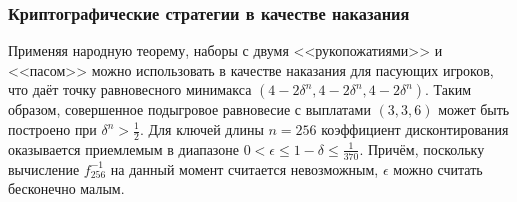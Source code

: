 \begin{frame}
	\frametitle{Криптографические стратегии в качестве наказания}
	Применяя народную теорему, наборы с двумя <<рукопожатиями>> и <<пасом>> можно использовать в качестве наказания для пасующих игроков, что даёт точку равновесного минимакса $(4 - 2 \delta^n, 4 - 2 \delta^n, 4 - 2 \delta^n)$. Таким образом, совершенное подыгровое равновесие с выплатами $(3, 3, 6)$ может быть построено при $\delta^n > \frac{1}{2}$. Для ключей длины $n = 256$ коэффициент дисконтирования оказывается приемлемым в диапазоне $0 < \epsilon \le 1 - \delta \le \frac{1}{370}$. Причём, поскольку вычисление $f_{256}^{-1}$ на данный момент считается невозможным, $\epsilon$ можно считать бесконечно малым.
\end{frame}